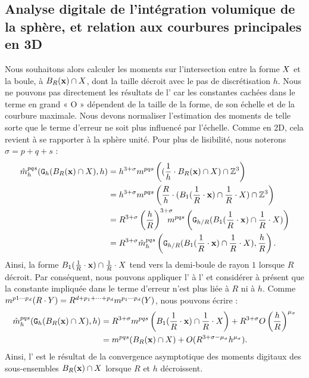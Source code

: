\subsection{Analyse digitale de l'intégration volumique de la sphère, et
relation aux courbures principales en 3D}
\label{sec:estimators:moments}
%
Nous souhaitons alors calculer les moments sur l'intersection entre la forme
$X$ et la boule, \cad à $B_{R}(\mathbf{x}) \cap X$, dont la taille décroit
avec le pas de discrétisation $h$. Nous ne pouvons pas directement les résultats
de l' car les constantes cachées dans le
terme en grand « O » dépendent de la taille de la forme, de son échelle et de la
courbure maximale. Nous devons normaliser l'estimation des moments de telle sorte
que le terme d'erreur ne soit plus influencé par l'échelle. Comme en 2D, cela
revient à se rapporter à la sphère unité. Pour plus de lisibilité, nous noterons
$\sigma = p + q + s$ :
%
\begin{align} \label{eq:MomentsOnUnitaryBall}
%
  \DMom{pqs}{h}(\DigF{\Ball{R}{\vx} \cap \Shape}{h},h) &= h^{3+\sigma}\Mom{pqs}\left
  ( (\frac{1}{h} \cdot \Ball{R}{\vx} \cap \Shape) \cap \Z^3 \right) \nonumber \\
  &= h^{3+{\sigma}} \Mom{pqs}\left( \frac{R}{h}\cdot(
  \Ball{1}{\frac{1}{R} \cdot \vx} \cap \frac{1}{R} \cdot \Shape) \cap \Z^3 \right) \nonumber \\
  &= R^{3+{\sigma}} \left( \frac{h}{R} \right)^{3+{\sigma}} \hspace{-0.3cm} \Mom{pqs} \left( \DigF{ \Ball{1}{\frac{1}{R}\cdot \vx}\cap\frac{1}{R}\cdot \Shape}{h/R} \right) \nonumber\\
  &= R^{3+{\sigma}}\DMom{pqs}{h}\left( \DigF{ \Ball{1}{\frac{1}{R}\cdot \vx}\cap\frac{1}{R}\cdot \Shape}{h/R}, {\frac{h}{R}} \right).
%
\end{align}
%
Ainsi, la forme $B_{1}(\frac{1}{R} \cdot \mathbf{x})\cap\frac{1}{R}\cdot X$
tend vers la demi-boule de rayon $1$ lorsque $R$ décroit. Par conséquent, nous
pouvons appliquer l' à
l' et considérer à présent que la constante
impliquée dans le terme d'erreur n'est plus liée à $R$ ni à $h$. Comme $m^{p1
\cdots p_d}(R \cdot Y) = R^{d+p_1+\cdots+p_d} m^{p_1 \cdots p_d}(Y)$, nous
pouvons écrire :
%
\begin{align} \label{eq:MomentsOnUnitaryBall-conv}
%
  \DMom{pqs}{h}(\DigF{\Ball{R}{\vx} \cap \Shape}{h},h) &= R^{3+\sigma}
  \Mom{pqs}\left( \Ball{1}{\frac{1}{R}\cdot \vx} \cap \frac{1}{R}\cdot \Shape
  \right) + R^{3+\sigma} O \left( \frac{h}{R} \right)^{\mu_{{\sigma}}}  \nonumber \\
   &= \Mom{pqs}( \Ball{R}{\vx} \cap \Shape ) + O( R^{3+{\sigma}-\mu_\sigma} h^{\mu_\sigma}).
%
\end{align}
%
Ainsi, l' est le résultat de la
convergence asymptotique des moments digitaux des sous-ensembles $B_{R}(\mathbf{x})
\cap X$ lorsque $R$ et $h$ décroissent.
%
